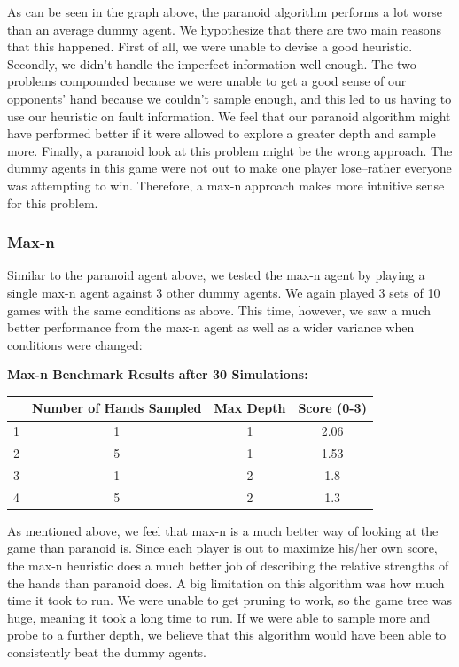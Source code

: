 \documentclass[11pt]{article}
\begin{document}
As can be seen in the graph above, the paranoid algorithm performs a lot worse than an average dummy agent. We hypothesize that there are two main reasons that this happened. First of all, we were unable to devise a good heuristic. Secondly, we didn't handle the imperfect information well enough. The two problems compounded because we were unable to get a good sense of our opponents' hand because we couldn't sample enough, and this led to us having to use our heuristic on fault information. We feel that our paranoid algorithm might have performed better if it were allowed to explore a greater depth and sample more. Finally, a paranoid look at this problem might be the wrong approach. The dummy agents in this game were not out to make one player lose--rather everyone was attempting to win. Therefore, a max-n approach makes more intuitive sense for this problem.

\subsubsection{Max-n}

Similar to the paranoid agent above, we tested the max-n agent by playing a single max-n agent against 3 other dummy agents. We again played 3 sets of 10 games with the same conditions as above. This time, however, we saw a much better performance from the max-n agent as well as a wider variance when conditions were changed:
\begin{center}
\textbf{Max-n Benchmark Results after 30 Simulations:}\\
\begin{tabular}{ c|c|c|c } 
 \hline
  & Number of Hands Sampled & Max Depth & Score  (0-3)\\ 
\hline
 1 & 1 & 1 & 2.06\\
 2 & 5 & 1 & 1.53\\
 3 & 1 & 2 &  1.8\\ 
 4 & 5 & 2 & 1.3 \\

 \hline
\end{tabular}
\end{center}

As mentioned above, we feel that max-n is a much better way of looking at the game than paranoid is. Since each player is out to maximize his/her own score, the max-n heuristic does a much better job of describing the relative strengths of the hands than paranoid does. A big limitation on this algorithm was how much time it took to run. We were unable to get pruning to work, so the game tree was huge, meaning it took a long time to run. If we were able to sample more and probe to a further depth, we believe that this algorithm would have been able to consistently beat the dummy agents.
\end{document}
